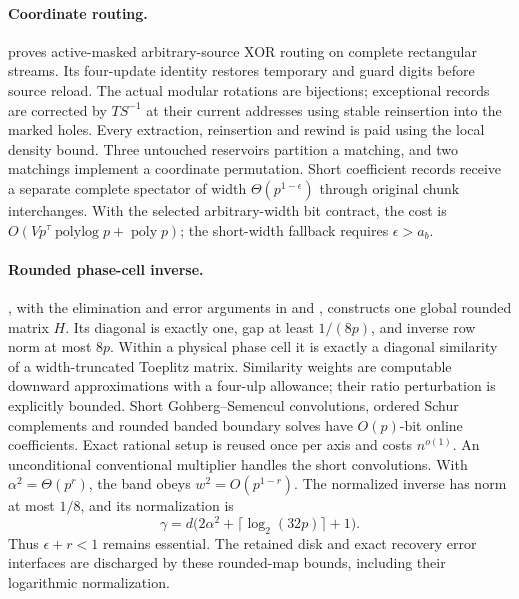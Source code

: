 \paragraph{Coordinate routing.}
 proves active-masked
arbitrary-source XOR routing on complete rectangular streams. Its
four-update identity restores temporary and guard digits before source
reload. The actual modular rotations are bijections; exceptional records
are corrected by $TS^{-1}$ at their current addresses using stable
reinsertion into the marked holes. Every extraction, reinsertion and
rewind is paid using the local density bound. Three untouched reservoirs
partition a matching, and two matchings implement a coordinate
permutation. Short coefficient records receive a separate complete
spectator of width $\Theta(p^{1-\epsilon})$ through original chunk
interchanges. With the selected arbitrary-width bit contract, the cost
is $O(Vp^\tau\operatorname{polylog}p+\operatorname{poly}p)$; the
short-width fallback requires $\epsilon>a_b$.

\paragraph{Rounded phase-cell inverse.}
, with the elimination and error
arguments in  and
, constructs one global rounded
matrix $H$. Its diagonal is exactly one, gap at least $1/(8p)$,
and inverse row norm at most $8p$. Within a physical phase cell it
is exactly a diagonal similarity of a width-truncated Toeplitz matrix.
Similarity weights are computable downward approximations with a
four-ulp allowance; their ratio perturbation is explicitly bounded.
Short Gohberg--Semencul convolutions, ordered Schur complements and
rounded banded boundary solves have $O(p)$-bit online coefficients.
Exact rational setup is reused once per axis and costs $n^{o(1)}$.
An unconditional conventional multiplier handles the short convolutions.
With $\alpha^2=\Theta(p^r)$, the band obeys $w^2=O(p^{1-r})$.
The normalized inverse has norm at most $1/8$, and its normalization is
\[
 \gamma=d\bigl(2\alpha^2+\lceil\log_2(32p)\rceil+1\bigr).
\]
Thus $\epsilon+r<1$ remains essential. The retained disk and exact
recovery error interfaces are discharged by these rounded-map bounds,
including their logarithmic normalization.

